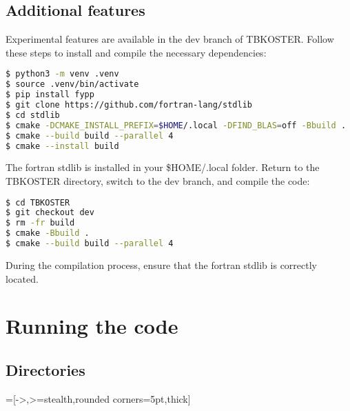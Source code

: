\documentclass[12pt, onecolumn]{memoir}
\begin{document}
\section{Additional features}
Experimental features are available in the dev branch of TBKOSTER. Follow these steps to install and compile the necessary dependencies:
\begin{lstlisting}[language=bash,basicstyle=\small\ttfamily,frame=single]
$ python3 -m venv .venv
$ source .venv/bin/activate
$ pip install fypp
$ git clone https://github.com/fortran-lang/stdlib
$ cd stdlib
$ cmake -DCMAKE_INSTALL_PREFIX=$HOME/.local -DFIND_BLAS=off -Bbuild .
$ cmake --build build --parallel 4
$ cmake --install build 
\end{lstlisting}

The fortran stdlib is installed in your \$HOME/.local folder. Return to the TBKOSTER directory, switch to the dev branch, and compile the code:
\begin{lstlisting}[language=bash,basicstyle=\small\ttfamily,frame=single]
$ cd TBKOSTER
$ git checkout dev
$ rm -fr build
$ cmake -Bbuild .
$ cmake --build build --parallel 4
\end{lstlisting}
During the compilation process, ensure that the fortran stdlib is correctly located.

\vfil
\pagebreak

\chapter{Running the code}

\section{Directories}

=[->,>=stealth,rounded corners=5pt,thick]
\end{document}
